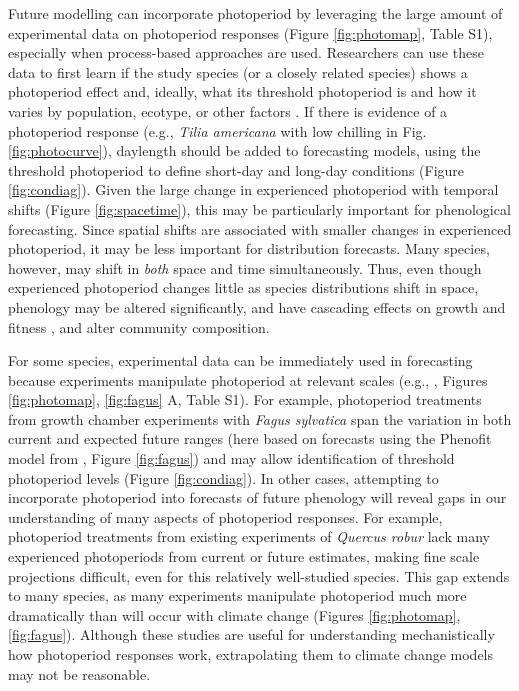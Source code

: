 \documentclass{article}
\begin{document}
\par Future modelling can incorporate photoperiod by leveraging the large amount of experimental data on photoperiod responses (Figure \ref{fig:photomap}, Table S1), especially when process-based approaches are used. Researchers can use these data to first learn if the study species (or a closely related species) shows a photoperiod effect and, ideally, what its threshold photoperiod is and how it varies by population, ecotype, or other factors \citep{bradshaw2006,gwinner1996,tobin2008}. If there is evidence of a photoperiod response (e.g., \emph{Tilia americana} with low chilling in Fig. \ref {fig:photocurve}), daylength should be added to forecasting models, using the threshold photoperiod to define short-day and long-day conditions (Figure \ref{fig:condiag}). Given the large change in experienced photoperiod with temporal shifts (Figure \ref{fig:spacetime}), this may be particularly important for phenological forecasting. Since spatial shifts are associated with smaller changes in experienced photoperiod, it may be less important for distribution forecasts. Many species, however, may shift in \emph{both} space and time simultaneously. Thus, even though experienced photoperiod changes little as species distributions shift in space, phenology may be altered significantly, and have cascading effects on growth and fitness \citep{duputie2015}, and alter community  composition.

\par For some species, experimental data can be immediately used in forecasting because experiments manipulate photoperiod at relevant scales (e.g., \citet{Basler:2014aa,Heide:2015aa}, Figures \ref{fig:photomap}, \ref{fig:fagus} A, Table S1).  For example, photoperiod treatments from growth chamber experiments with \emph{Fagus sylvatica} span the variation in both current and expected future ranges (here based on forecasts using the Phenofit model from \citet{duputie2015}, Figure \ref{fig:fagus}) and may allow identification of threshold photoperiod levels (Figure \ref{fig:condiag}). In other cases, attempting to incorporate photoperiod into forecasts of future phenology will reveal gaps in our understanding of many aspects of photoperiod responses. For example, photoperiod treatments from existing experiments of \emph{Quercus robur} lack many experienced photoperiods from current or future estimates, making fine scale projections difficult, even for this relatively well-studied species. This gap extends to many species, as many experiments manipulate photoperiod much more dramatically than will occur with climate change (Figures \ref{fig:photomap}, \ref{fig:fagus}). Although these studies are useful for understanding mechanistically how photoperiod responses work, extrapolating them to climate change models may not be reasonable.
\end{document}
